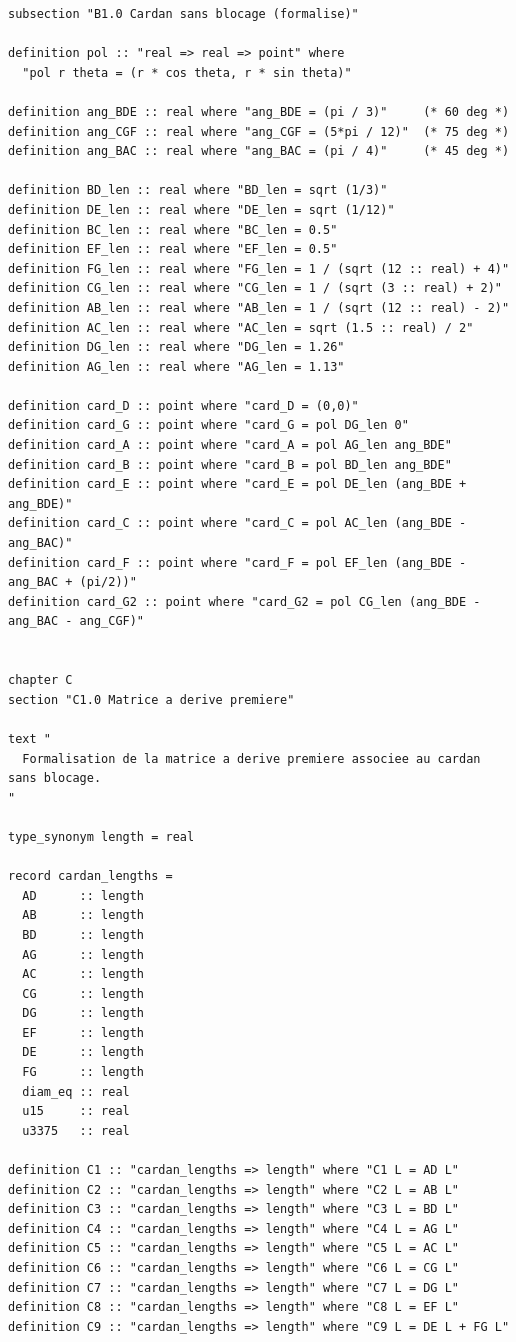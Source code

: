 \documentclass[12pt,a4paper]{article}
\begin{document}
\begin{verbatim}
subsection "B1.0 Cardan sans blocage (formalise)"

definition pol :: "real => real => point" where
  "pol r theta = (r * cos theta, r * sin theta)"

definition ang_BDE :: real where "ang_BDE = (pi / 3)"     (* 60 deg *)
definition ang_CGF :: real where "ang_CGF = (5*pi / 12)"  (* 75 deg *)
definition ang_BAC :: real where "ang_BAC = (pi / 4)"     (* 45 deg *)

definition BD_len :: real where "BD_len = sqrt (1/3)"
definition DE_len :: real where "DE_len = sqrt (1/12)"
definition BC_len :: real where "BC_len = 0.5"
definition EF_len :: real where "EF_len = 0.5"
definition FG_len :: real where "FG_len = 1 / (sqrt (12 :: real) + 4)"
definition CG_len :: real where "CG_len = 1 / (sqrt (3 :: real) + 2)"
definition AB_len :: real where "AB_len = 1 / (sqrt (12 :: real) - 2)"
definition AC_len :: real where "AC_len = sqrt (1.5 :: real) / 2"
definition DG_len :: real where "DG_len = 1.26"
definition AG_len :: real where "AG_len = 1.13"

definition card_D :: point where "card_D = (0,0)"
definition card_G :: point where "card_G = pol DG_len 0"
definition card_A :: point where "card_A = pol AG_len ang_BDE"
definition card_B :: point where "card_B = pol BD_len ang_BDE"
definition card_E :: point where "card_E = pol DE_len (ang_BDE + ang_BDE)"
definition card_C :: point where "card_C = pol AC_len (ang_BDE - ang_BAC)"
definition card_F :: point where "card_F = pol EF_len (ang_BDE - ang_BAC + (pi/2))"
definition card_G2 :: point where "card_G2 = pol CG_len (ang_BDE - ang_BAC - ang_CGF)"


chapter C
section "C1.0 Matrice a derive premiere"

text "
  Formalisation de la matrice a derive premiere associee au cardan sans blocage.
"

type_synonym length = real

record cardan_lengths =
  AD      :: length
  AB      :: length
  BD      :: length
  AG      :: length
  AC      :: length
  CG      :: length
  DG      :: length
  EF      :: length
  DE      :: length
  FG      :: length
  diam_eq :: real
  u15     :: real
  u3375   :: real

definition C1 :: "cardan_lengths => length" where "C1 L = AD L"
definition C2 :: "cardan_lengths => length" where "C2 L = AB L"
definition C3 :: "cardan_lengths => length" where "C3 L = BD L"
definition C4 :: "cardan_lengths => length" where "C4 L = AG L"
definition C5 :: "cardan_lengths => length" where "C5 L = AC L"
definition C6 :: "cardan_lengths => length" where "C6 L = CG L"
definition C7 :: "cardan_lengths => length" where "C7 L = DG L"
definition C8 :: "cardan_lengths => length" where "C8 L = EF L"
definition C9 :: "cardan_lengths => length" where "C9 L = DE L + FG L"


\end{verbatim}
\end{document}

